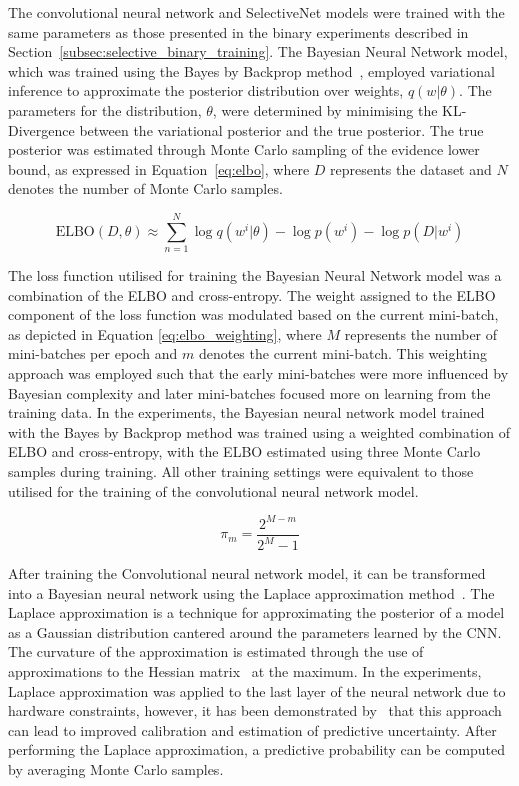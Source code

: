 The convolutional neural network and SelectiveNet models were trained with the same parameters as those presented in the binary experiments described in Section~\ref{subsec:selective_binary_training}. The Bayesian Neural Network model, which was trained using the Bayes by Backprop method~\citep{Blundell2015Weight}, employed variational inference to approximate the posterior distribution over weights, $q(w|\theta)$. The parameters for the distribution, $\theta$, were determined by minimising the KL-Divergence between the variational posterior and the true posterior. The true posterior was estimated through Monte Carlo sampling of the evidence lower bound, as expressed in Equation~\ref{eq:elbo}, where $D$ represents the dataset and $N$ denotes the number of Monte Carlo samples.

\begin{equation}
	\text{ELBO}(D, \theta) \approx \sum^N_{n=1}\log q(w^i|\theta)-\log p(w^i) - \log p(D|w^i)
	\label{eq:elbo}
\end{equation}

The loss function utilised for training the Bayesian Neural Network model was a combination of the ELBO and cross-entropy. The weight assigned to the ELBO component of the loss function was modulated based on the current mini-batch, as depicted in Equation \ref{eq:elbo_weighting}, where $M$ represents the number of mini-batches per epoch and $m$ denotes the current mini-batch. This weighting approach was employed such that the early mini-batches were more influenced by Bayesian complexity and later mini-batches focused more on learning from the training data. In the experiments, the Bayesian neural network model trained with the Bayes by Backprop method was trained using a weighted combination of ELBO and cross-entropy, with the ELBO estimated using three Monte Carlo samples during training. All other training settings were equivalent to those utilised for the training of the convolutional neural network model.

\begin{equation}
	\pi_m = \frac{2^{M-m}}{2^M-1}
	\label{eq:elbo_weighting}
\end{equation}

After training the Convolutional neural network model, it can be transformed into a Bayesian neural network using the Laplace approximation method~\citep{mackay1992bayesian}. The Laplace approximation is a technique for approximating the posterior of a model as a Gaussian distribution cantered around the parameters learned by the CNN. The curvature of the approximation is estimated through the use of approximations to the Hessian matrix~\citep{botev2017practical} at the maximum. In the experiments, Laplace approximation was applied to the last layer of the neural network due to hardware constraints, however, it has been demonstrated by~\cite{kristiadi2020being} that this approach can lead to improved calibration and estimation of predictive uncertainty. After performing the Laplace approximation, a predictive probability can be computed by averaging Monte Carlo samples.


